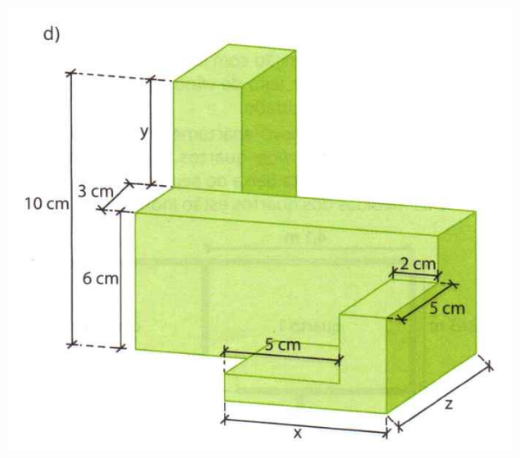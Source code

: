 \documentclass[a4paper,14pt]{article}
\begin{document}
\begin{multicols}{2}
\begin{enumerate}
			\includegraphics[width=0.8\linewidth]{6FMA29_imagens/imagem4}
		\end{enumerate}
	\end{multicols}
\end{document}
